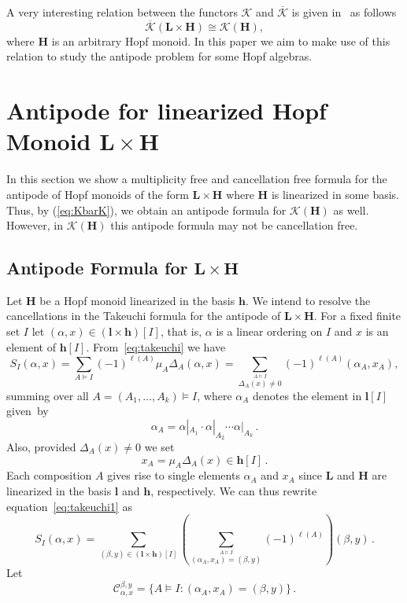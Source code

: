 \documentclass[10pt]{amsart}
\theoremstyle{definition}
\newcommand{\bL}{\mathbf{L}}
\newcommand{\bH}{\mathbf{H}}
\newcommand{\bh}{\mathbf{h}}
\newcommand{\Kc}{\mathcal{K}}
\newcommand{\Kcb}{\overline{\Kc}}
\begin{document}
A very interesting relation between the functors $\Kc$ and $\Kcb$ is given in~\cite[Theorem~15.13]{AM:2010} as follows
\begin{equation}\label{eq:KbarK}
 \Kcb(\bL\times\bH) \cong \Kc(\bH),
\end{equation}
where $\bH$ is an arbitrary Hopf monoid. In this paper we aim to make use of this relation to study the antipode problem for some Hopf algebras.


\section{Antipode for linearized Hopf Monoid \texorpdfstring{$\bL\times \bH$}{L times H}}\label{s:antiLxH}

In this section we show a multiplicity free and cancellation free formula for the antipode of Hopf monoids of the form $\bL\times \bH$ where $\bH$ is linearized in some basis. Thus, by (\ref{eq:KbarK}), we obtain an antipode formula for $\Kc(\bH)$ as well. However, in $\Kc(\bH)$ this antipode formula may not be cancellation free. 

\subsection{Antipode Formula for \texorpdfstring{$\bL\times \bH$}{L times H}}\label{ss:UsingTakeushi}

Let $\bH$ be a Hopf monoid linearized in the basis $\bh$. We intend to resolve the cancellations in the Takeuchi formula for the antipode of $\bL\times\bH$. For a fixed finite set $I$ let $(\alpha,x)\in (\mathbf{l}\times\bh)[I]$, that is, $\alpha$ is a linear ordering on $I$ and $x$ is an element of $\bh [I]$. From~\eqref{eq:takeuchi} we have
\begin{equation}\label{eq:takeuchi1}
 S_I(\alpha,x) = \sum_{A\models I} (-1)^{\ell(A)} \mu_A \Delta_A(\alpha,x)
 = \sum_{\stackrel{A\models I} %
 {\Delta_A(x)\ne 0}} (-1)^{\ell(A)} (\alpha_A,x_A),
\end{equation}
 summing over all $A=(A_1,\ldots,A_k)\models I$, where $\alpha_A$ denotes the element in $\mathbf{l} [I]$ given~by
 $$\alpha_A= \alpha|_{A_1}\cdot \alpha|_{A_2}\cdots \alpha|_{A_k}\,.
$$ Also, provided $\Delta_A(x)\neq 0$ we set
 $$x_A=\mu_A\Delta_A(x) \in \bh[I]\,.$$
Each composition $A$ gives rise to single elements $\alpha_A$ and $x_A$ since $\bL$ and $\bH$ are linearized in the basis $\mathbf{l}$ and $\bh$, respectively. 
We can thus rewrite equation~\eqref{eq:takeuchi1} as
\begin{equation}\label{eq:takeuchi2}
 S_I(\alpha,x) = \sum_{(\beta,y)\in (\mathbf{l}\times\bh)[I]}\left(\sum_{\stackrel{A\models I}
 {(\alpha_A,x_A)=(\beta,y)}} (-1)^{\ell(A)}\right) (\beta,y)\,.
\end{equation}
Let 
\begin{equation}\label{eq:alphabetaxy}
 \mathcal{C}_{\alpha,x}^{\beta,y}=\big\{A\models I : (\alpha_A,x_A)=(\beta,y)\big\}\,.
 \end{equation}
\end{document}
